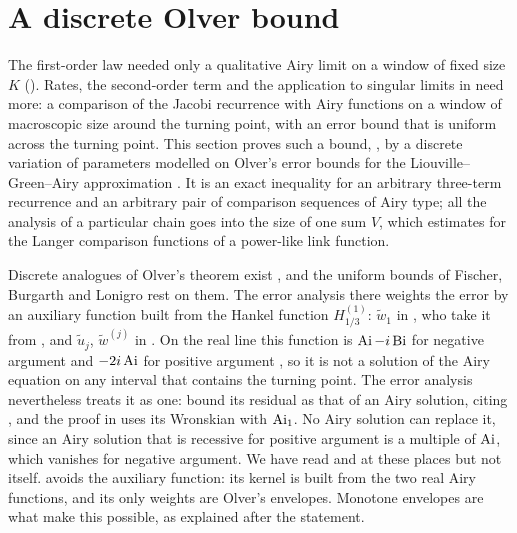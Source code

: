 \section{A discrete Olver bound}\label{sec:olver}

The first-order law needed only a qualitative Airy limit on a window of fixed size $K$
(). Rates, the second-order term and the application to singular
limits in  need more: a comparison of the Jacobi recurrence with Airy
functions on a window of macroscopic size around the turning point, with an error
bound that is uniform across the turning point. This section proves such a bound,
, by a discrete variation of parameters modelled on Olver's error
bounds for the Liouville--Green--Airy approximation \cite[Ch.~11]{Olver1974}. It is an
exact inequality for an arbitrary three-term recurrence and an arbitrary pair of
comparison sequences of Airy type; all the analysis of a particular chain goes into the
size of one sum $V$, which  estimates for the Langer comparison functions
of a power-like link function.

Discrete analogues of Olver's theorem exist \cite{GeronimoBrunoVanAssche2004,Geronimo2009},
and the uniform bounds of Fischer, Burgarth and Lonigro \cite{FBL2026} rest on them. The error
analysis there weights the error by an auxiliary function built from the Hankel function
$H^{(1)}_{1/3}$: $\tilde w_1$ in \cite[Def.~A.2]{FBL2026}, who take it from \cite[eq.~(4.4)]{GeronimoBrunoVanAssche2004},
and $\tilde u_j$, $\tilde w^{(j)}$ in \cite[(2.22), (3.51)]{Geronimo2009}. On the real line this function is
$\operatorname{Ai}-i\operatorname{Bi}$ for negative argument and $-2i\operatorname{Ai}$ for positive argument \cite[(A.14)--(A.16)]{FBL2026}, so it
is not a solution of the Airy equation on any interval that contains the turning point. The error
analysis nevertheless treats it as one: \cite[(B.43)--(B.44)]{FBL2026} bound its residual as that of an
Airy solution, citing \cite[p.~119]{GeronimoBrunoVanAssche2004}, and the proof in \cite[App.~A, near
(A.43)]{Geronimo2009} uses its Wronskian with $\operatorname{Ai}_1$. No Airy solution can replace it, since an Airy
solution that is recessive for positive argument is a multiple of $\operatorname{Ai}$, which vanishes for negative
argument. We have read \cite{Geronimo2009} and \cite{FBL2026} at these places but not
\cite{GeronimoBrunoVanAssche2004} itself.  avoids the auxiliary function: its kernel is
built from the two real Airy functions, and its only weights are Olver's envelopes. Monotone envelopes
are what make this possible, as explained after the statement.

